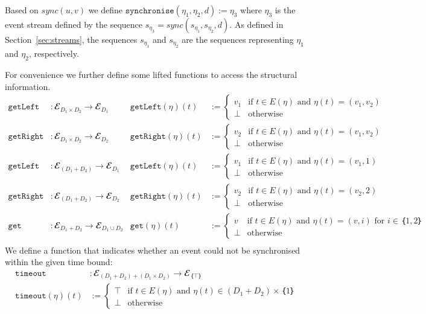 Based on $sync(u,v)$ we define $\mathtt{synchronise}(η_1,η_2,d) := η_3$ where $η_3$ is the event stream defined by the sequence $s_{η_3} = sync(s_{η_1}, s_{η_2},d)$. 
As defined in Section~\ref{sec:streams}, the sequences $s_{η_1}$ and $s_{η_2}$ are the sequences representing $η_1$ and $η_2$, respectively.

For convenience we further define some lifted functions to access the structural information.
\begin{align*}
  \mathtt{getLeft}&: 𝓔_{D_1×D_2} → 𝓔_{D_1}
    & \mathtt{getLeft}(η)(t) &:= \begin{cases}
        v_1 & \text{if } t∈E(η) \text{ and } η(t) = (v_1,v_2)\\
        ⊥ & \text{otherwise}
      \end{cases}\\
%
  \mathtt{getRight}&: 𝓔_{D_1×D_2} → 𝓔_{D_2}
    & \mathtt{getRight}(η)(t) &:= \begin{cases}
        v_2 & \text{if } t∈E(η) \text{ and } η(t) = (v_1,v_2)\\
        ⊥ & \text{otherwise}
      \end{cases}\\
%      
  \mathtt{getLeft}&: 𝓔_{(D_1+D_2)} → 𝓔_{D_1}
    & \mathtt{getLeft}(η)(t) &:= \begin{cases}
        v_1 & \text{if } t∈E(η) \text{ and } η(t) = (v_1,1)\\
        ⊥ & \text{otherwise}
      \end{cases}\\
%
  \mathtt{getRight}&: 𝓔_{(D_1+D_2)} → 𝓔_{D_2}
    & \mathtt{getRight}(η)(t) &:= \begin{cases}
        v_2 & \text{if } t∈E(η) \text{ and } η(t) = (v_2,2)\\
        ⊥ & \text{otherwise}
      \end{cases}\\
%
  \mathtt{get}&: 𝓔_{D_1+D_2} → 𝓔_{D_1∪D_2}
    & \mathtt{get}(η)(t) &:= \begin{cases}
        v & \text{if } t∈E(η) \text{ and } η(t) = (v,i) \text{ for } i∈｛1,2｝\\
        ⊥ & \text{otherwise}
      \end{cases}\\
\end{align*}
%
We define a function that indicates whether an event could not be synchronised within the given time bound:
\begin{align*}
  \mathtt{timeout}&: 𝓔_{(D_1+D_2)+(D_1×D_2)} → 𝓔_{｛⊤｝}\\
   \mathtt{timeout}(η)(t) & := \begin{cases}
            ⊤ & \text{if } t∈E(η) \text{ and } η(t) ∈(D_1+D_2)×｛1｝\\
            ⊥ & \text{otherwise}
          \end{cases}\\
\end{align*}
